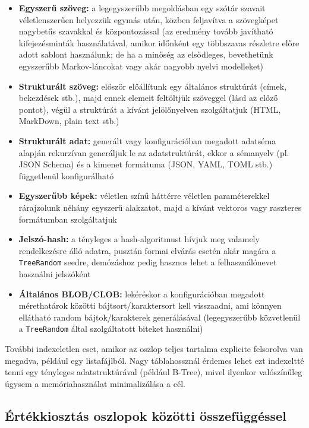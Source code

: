 \documentclass[
    parspace,
    noindent,
    nohyp,
]{elteiktdk}[2023/04/10]
\begin{document}
\begin{itemize}
  \item \textbf{Egyszerű szöveg:}
    a legegyszerűbb megoldásban egy szótár szavait véletlenszerűen helyezzük egymás után,
    közben feljavítva a szövegképet nagybetűs szavakkal és központozással
    (az eredmény tovább javítható kifejezésminták használatával,
    amikor időnként egy többszavas részletre előre adott sablont használunk;
    de ha a minőség az elsődleges, bevethetünk egyszerűbb Markov-láncokat\cite{Artut2019UsingAM}
    vagy akár nagyobb nyelvi modelleket)
  \item \textbf{Strukturált szöveg:}
    először előállítunk egy általános struktúrát (címek, bekezdések stb.),
    majd ennek elemeit feltöltjük szöveggel (lásd az előző pontot),
    végül a struktúrát a kívánt jelölőnyelven szolgáltatjuk (HTML, MarkDown, plain text stb.)
  \item \textbf{Strukturált adat:}
    generált vagy konfigurációban megadott adatséma alapján rekurzívan generáljuk le az adatstruktúrát,
    ekkor a sémanyelv (pl. JSON Schema) és a kimenet formátuma (JSON, YAML, TOML stb.)
    függetlenül konfigurálható
  \item \textbf{Egyszerűbb képek:}
    véletlen színű háttérre véletlen paraméterekkel
    rárajzolunk néhány egyszerű alakzatot,
    majd a kívánt vektoros vagy raszteres formátumban szolgáltatjuk
  \item \textbf{Jelszó-hash:}
    a tényleges a hash-algoritmust hívjuk meg valamely rendelkezésre álló adatra,
    pusztán formai elvárás esetén akár magára a \texttt{TreeRandom} seedre,
    demózáshoz pedig hasznos lehet a felhasználónevet használni jelszóként
  \item \textbf{Általános BLOB/CLOB:}
    lekéréskor a konfigurációban megadott mérethatárok közötti bájtsort/karaktersort kell visszaadni,
    ami könnyen ellátható random bájtok/karakterek generálásával
    (legegyszerűbb közvetlenül a \texttt{TreeRandom} által szolgáltatott biteket használni)
\end{itemize}

További indexeletlen eset, amikor az oszlop teljes tartalma explicite felsorolva van megadva,
például egy listafájlból.
Nagy táblahossznál érdemes lehet ezt indexeltté tenni egy tényleges adatstruktúrával (például B-Tree),
mivel ilyenkor valószínűleg úgysem a memóriahasználat minimalizálása a cél.

\subsection{Értékkiosztás oszlopok közötti összefüggéssel}
\end{document}
